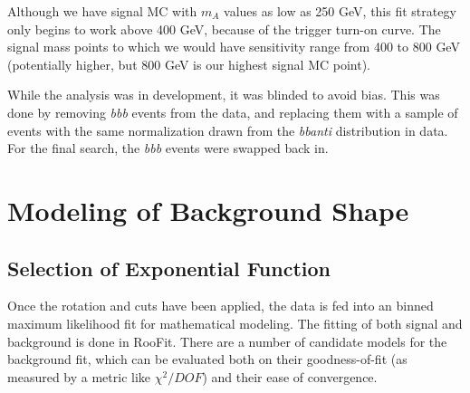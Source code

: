 Although we have signal MC with $m_A$ values as low as 250 GeV, this fit strategy only
begins to work above 400 GeV, because of the trigger turn-on curve.  The signal mass 
points to which we would have sensitivity range from 400 to 800 GeV (potentially higher,
but 800 GeV is our highest signal MC point). 

While the analysis was in development, it was blinded to avoid bias.  This was done 
by removing \textit{bbb} events from the data, and replacing them with a sample of
events with the same normalization drawn from the \textit{bbanti} distribution
in data.  For the final search, the \textit{bbb} events were swapped back in.








\section{Modeling of Background Shape}
\subsection{Selection of Exponential Function}
Once the rotation and cuts have been applied, the data is fed into an 
binned maximum likelihood fit for mathematical modeling.  The fitting
of both signal and background is done in RooFit.  There are a number 
of candidate models for the background fit, which can be evaluated
both on their goodness-of-fit (as measured by a metric like $\chi^2/DOF$)
and their ease of convergence.

